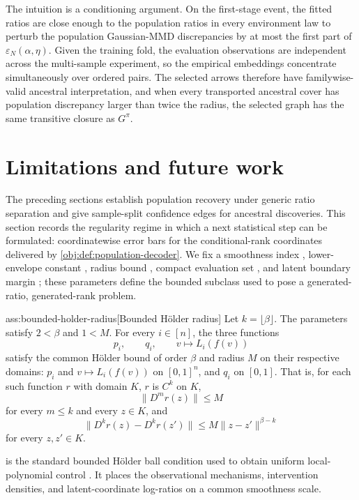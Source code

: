 \documentclass[11pt]{article}
\begin{document}
The intuition is a conditioning argument. On the first-stage event, the fitted ratios are close enough to the population ratios in every environment law to perturb the population Gaussian-MMD discrepancies by at most the first part of \(\varepsilon_N(\alpha,\eta)\). Given the training fold, the evaluation observations are independent across the multi-sample experiment, so the empirical embeddings concentrate simultaneously over ordered pairs. The selected arrows therefore have familywise-valid ancestral interpretation, and when every transported ancestral cover has population discrepancy larger than twice the radius, the selected graph has the same transitive closure as \(G^\pi\).


\section{Limitations and future work}\label{sec:limitations}

The preceding sections establish population recovery under generic ratio separation and give sample-split confidence edges for ancestral discoveries. This section records the regularity regime in which a next statistical step can be formulated: coordinatewise error bars for the conditional-rank coordinates delivered by \cref{obj:def:population-decoder}. We fix a smoothness index , lower-envelope constant , radius bound , compact evaluation set , and latent boundary margin ; these parameters define the bounded subclass used to pose a generated-ratio, generated-rank problem.

\begin{assumptionv}{ass:bounded-holder-radius}[Bounded Hölder radius]
Let \(k=\lfloor \beta\rfloor\). The parameters satisfy \(2<\beta\) and \(1<M\). For every \(i\in[n]\), the three functions
\[
p_i,\qquad q_i,\qquad v\mapsto L_i(f(v))
\]
satisfy the common Hölder bound of order \(\beta\) and radius \(M\) on their respective domains: \(p_i\) and \(v\mapsto L_i(f(v))\) on \([0,1]^n\), and \(q_i\) on \([0,1]\). That is, for each such function \(r\) with domain \(K\), \(r\) is \(C^k\) on \(K\),
\[
\|D^m r(z)\|\le M
\]
for every \(m\le k\) and every \(z\in K\), and
\[
\|D^k r(z)-D^k r(z')\|\le M\|z-z'\|^{\beta-k}
\]
for every \(z,z'\in K\).
\end{assumptionv}

 is the standard bounded Hölder ball condition used to obtain uniform local-polynomial control \citep{Xie2023UniformConditionalCDF}. It places the observational mechanisms, intervention densities, and latent-coordinate log-ratios on a common smoothness scale.
\end{document}
